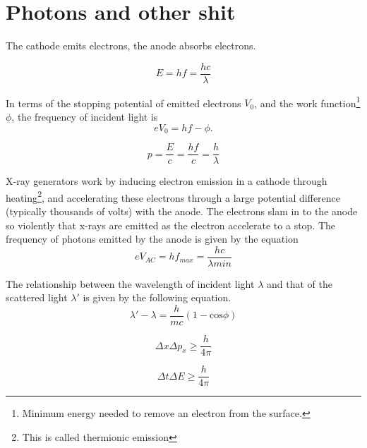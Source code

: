 \documentclass[nobib,notoc]{tufte-handout}
\begin{document}
\section{Photons and other shit}
\begin{defi}
	The cathode emits electrons, the anode absorbs electrons.
\end{defi}
\begin{defi}
	\begin{equation*}
		E=hf=\frac{hc}{\lambda}
	\end{equation*}
\end{defi}
\begin{defi}
	In terms of the stopping potential of emitted electrons \(V_0\), and the work function\footnote{Minimum energy needed to remove an electron from the surface.} \(\phi\), the frequency of incident light is
	\begin{equation*}
		eV_0=hf-\phi.
	\end{equation*}
\end{defi}
\begin{defi}
	\begin{equation*}
		p=\frac{E}{c}=\frac{hf}{c}=\frac{h}{\lambda}
	\end{equation*}
\end{defi}
\begin{defi}
	X-ray generators work by inducing electron emission in a cathode through heating\footnote{This is called thermionic emission}, and accelerating these electrons through a large potential difference (typically thousands of volts) with the anode. The electrons slam in to the anode so violently that x-rays are emitted as the electron accelerate to a stop. The frequency of photons emitted by the anode is given by the equation
	\begin{equation*}
		eV_{AC}=hf_{max}=\frac{hc}{\lambda{min}}
	\end{equation*}
\end{defi}
\begin{defi}
	The relationship between the wavelength of incident light \(\lambda\) and that of the scattered light \(\lambda'\) is given by the following equation.
	\begin{equation*}
		\lambda'-\lambda=\frac{h}{mc}(1-\text{cos}\phi)
	\end{equation*}
\end{defi}
\begin{defi}
	\begin{equation*}
		\Delta x\Delta p_x\geq \frac{h}{4\pi}
	\end{equation*}
\end{defi}
\begin{defi}
	\begin{equation*}
		\Delta t\Delta E\geq\frac{h}{4\pi}
	\end{equation*}
\end{defi}
\end{document}
